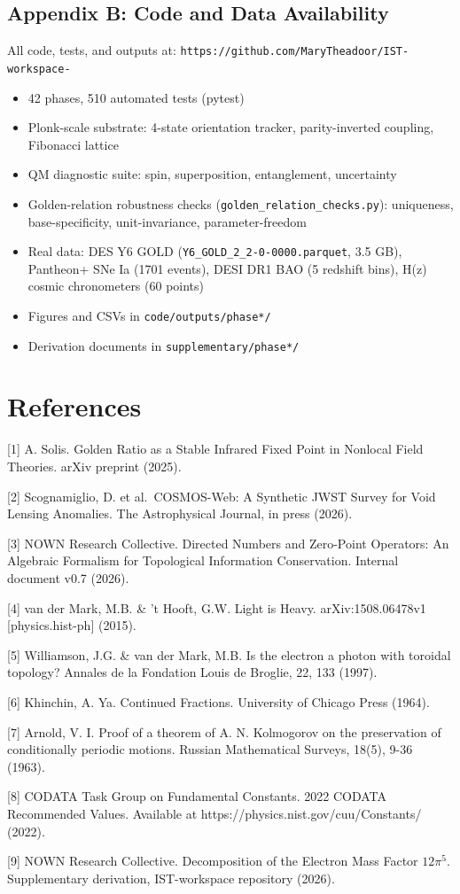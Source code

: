 \documentclass[
  11pt,
]{article}
\providecommand{\tightlist}{%
  \setlength{\itemsep}{0pt}\setlength{\parskip}{0pt}}
\begin{document}
\subsection{Appendix B: Code and Data
Availability}\label{appendix-b-code-and-data-availability}

All code, tests, and outputs at:
\texttt{https://github.com/MaryTheadoor/IST-workspace-}

\begin{itemize}
\tightlist
\item
  42 phases, 510 automated tests (pytest)
\item
  Plonk-scale substrate: 4-state orientation tracker, parity-inverted
  coupling, Fibonacci lattice
\item
  QM diagnostic suite: spin, superposition, entanglement, uncertainty
\item
  Golden-relation robustness checks
  (\texttt{golden\_relation\_checks.py}): uniqueness, base-specificity,
  unit-invariance, parameter-freedom
\item
  Real data: DES Y6 GOLD (\texttt{Y6\_GOLD\_2\_2-0-0000.parquet}, 3.5
  GB), Pantheon+ SNe Ia (1701 events), DESI DR1 BAO (5 redshift bins),
  H(z) cosmic chronometers (60 points)
\item
  Figures and CSVs in \texttt{code/outputs/phase*/}
\item
  Derivation documents in \texttt{supplementary/phase*/}
\end{itemize}

\section{References}\label{references}

{[}1{]} A. Solis. Golden Ratio as a Stable Infrared Fixed Point in
Nonlocal Field Theories. arXiv preprint (2025).

{[}2{]} Scognamiglio, D. et al.~COSMOS-Web: A Synthetic JWST Survey for
Void Lensing Anomalies. The Astrophysical Journal, in press (2026).

{[}3{]} NOWN Research Collective. Directed Numbers and Zero-Point
Operators: An Algebraic Formalism for Topological Information
Conservation. Internal document v0.7 (2026).

{[}4{]} van der Mark, M.B. \& 't Hooft, G.W. Light is Heavy.
arXiv:1508.06478v1 {[}physics.hist-ph{]} (2015).

{[}5{]} Williamson, J.G. \& van der Mark, M.B. Is the electron a photon
with toroidal topology? Annales de la Fondation Louis de Broglie, 22,
133 (1997).

{[}6{]} Khinchin, A. Ya. Continued Fractions. University of Chicago
Press (1964).

{[}7{]} Arnold, V. I. Proof of a theorem of A. N. Kolmogorov on the
preservation of conditionally periodic motions. Russian Mathematical
Surveys, 18(5), 9-36 (1963).

{[}8{]} CODATA Task Group on Fundamental Constants. 2022 CODATA
Recommended Values. Available at https://physics.nist.gov/cuu/Constants/
(2022).

{[}9{]} NOWN Research Collective. Decomposition of the Electron Mass
Factor \(12\pi^5\). Supplementary derivation, IST-workspace repository
(2026).
\end{document}
